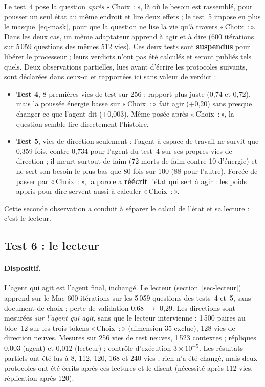 \documentclass[11pt,a4paper]{article}
\newcommand{\Choix}{«\,Choix~:\,»}
\begin{document}
Le test~4 pose la question \emph{après} \Choix{}, là où le besoin est rassemblé,
pour pousser un seul état au même endroit et lire deux effets ; le test~5 impose
en plus le masque~\eqref{eq-mask}, pour que la question ne lise la vie qu'à travers
\Choix{}. Dans les deux cas, un même adaptateur apprend à agir et à dire
(600 itérations sur 5\,059 questions des mêmes 512 vies). Ces deux tests sont
\textbf{suspendus} pour libérer le processeur ; leurs verdicts n'ont pas été
calculés et seront publiés tels quels. Deux observations partielles, lues avant
d'écrire les protocoles suivants, sont déclarées dans ceux-ci et rapportées ici
sans valeur de verdict :
\begin{itemize}
\item \textbf{Test 4}, 8 premières vies de test sur 256 : rapport plus juste
(0,74 et 0,72), mais la poussée \og énergie basse \fg{} sur \Choix{} fait agir
(+0,20) sans presque changer ce que l'agent dit (+0,003). Même posée après
\Choix{}, la question semble lire directement l'histoire.
\item \textbf{Test 5}, vies de direction seulement : l'agent à espace de travail
ne survit que 0,359 fois, contre 0,734 pour l'agent du test~4 sur ses propres vies
de direction ; il meurt surtout de faim (72 morts de faim contre 10 d'énergie) et
ne sert son besoin le plus bas que 80 fois sur 100 (88 pour l'autre). Forcée de
passer par \Choix{}, la parole a \textbf{réécrit} l'état qui sert à agir : les
poids appris pour dire servent aussi à calculer \Choix{}.
\end{itemize}
Cette seconde observation a conduit à séparer le calcul de l'état et sa lecture :
c'est le lecteur.

\subsection{Test 6 : le lecteur}
\label{sec-t6}

\paragraph{Dispositif.} L'agent qui agit est l'agent final, inchangé. Le lecteur
(section~\ref{sec-lecteur}) apprend sur le Mac 600 itérations sur les 5\,059
questions des tests~4 et~5, sans document de choix ; perte de validation
0,68 $\to$ 0,29. Les directions sont mesurées \emph{sur l'agent qui agit}, sans
que le lecteur intervienne : 1\,500 paires au bloc~12 sur les trois tokens
\Choix{} (dimension 35 exclue), 128 vies de direction neuves. Mesures sur 256 vies
de test neuves, 1\,523 contextes ; répliques 0,003 (agent) et 0,012 (lecteur) ;
contrôle d'exécution $3\times10^{-5}$. Les résultats partiels ont été lus à 8,
112, 120, 168 et 240 vies ; rien n'a été changé, mais deux protocoles ont été écrits
après ces lectures et le disent (nécessité après 112 vies, réplication après 120).
\end{document}
